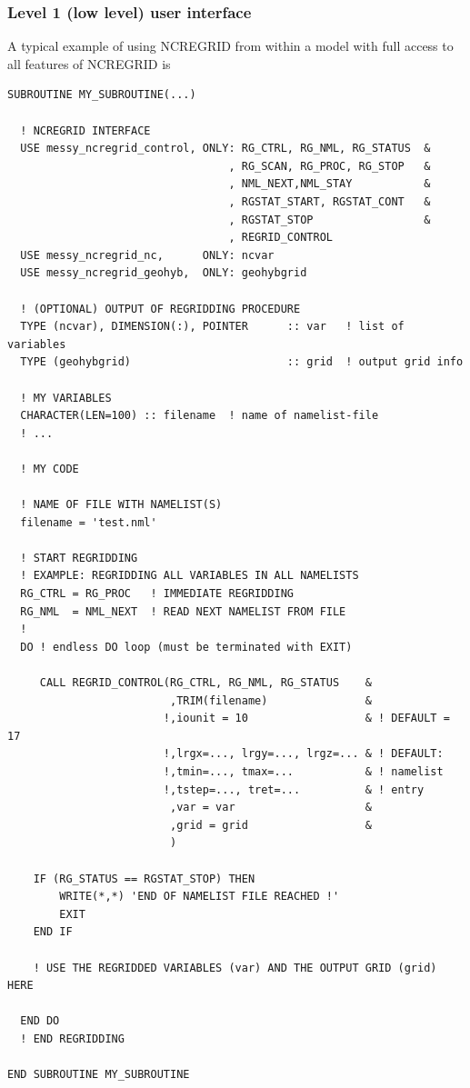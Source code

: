 \documentclass[12pt, a4paper]{article}
\begin{document}
\subsubsection{Level 1 (low level) user interface}
\label{sec:level1}
A typical example of using NCREGRID from within a model 
with full access to all features of NCREGRID is
%
\begin{verbatim}
SUBROUTINE MY_SUBROUTINE(...)

  ! NCREGRID INTERFACE
  USE messy_ncregrid_control, ONLY: RG_CTRL, RG_NML, RG_STATUS  &
                                  , RG_SCAN, RG_PROC, RG_STOP   &
                                  , NML_NEXT,NML_STAY           &
                                  , RGSTAT_START, RGSTAT_CONT   &
                                  , RGSTAT_STOP                 &
                                  , REGRID_CONTROL
  USE messy_ncregrid_nc,      ONLY: ncvar
  USE messy_ncregrid_geohyb,  ONLY: geohybgrid
 
  ! (OPTIONAL) OUTPUT OF REGRIDDING PROCEDURE
  TYPE (ncvar), DIMENSION(:), POINTER      :: var   ! list of variables
  TYPE (geohybgrid)                        :: grid  ! output grid info 

  ! MY VARIABLES
  CHARACTER(LEN=100) :: filename  ! name of namelist-file
  ! ...

  ! MY CODE

  ! NAME OF FILE WITH NAMELIST(S)
  filename = 'test.nml'

  ! START REGRIDDING
  ! EXAMPLE: REGRIDDING ALL VARIABLES IN ALL NAMELISTS
  RG_CTRL = RG_PROC   ! IMMEDIATE REGRIDDING
  RG_NML  = NML_NEXT  ! READ NEXT NAMELIST FROM FILE
  !
  DO ! endless DO loop (must be terminated with EXIT)

     CALL REGRID_CONTROL(RG_CTRL, RG_NML, RG_STATUS    &
                         ,TRIM(filename)               &
                        !,iounit = 10                  & ! DEFAULT = 17
                        !,lrgx=..., lrgy=..., lrgz=... & ! DEFAULT:
                        !,tmin=..., tmax=...           & ! namelist
                        !,tstep=..., tret=...          & ! entry
                         ,var = var                    &
                         ,grid = grid                  &
                         )

    IF (RG_STATUS == RGSTAT_STOP) THEN
        WRITE(*,*) 'END OF NAMELIST FILE REACHED !'
        EXIT
    END IF

    ! USE THE REGRIDDED VARIABLES (var) AND THE OUTPUT GRID (grid) HERE

  END DO
  ! END REGRIDDING

END SUBROUTINE MY_SUBROUTINE
\end{verbatim}
%
\end{document}
